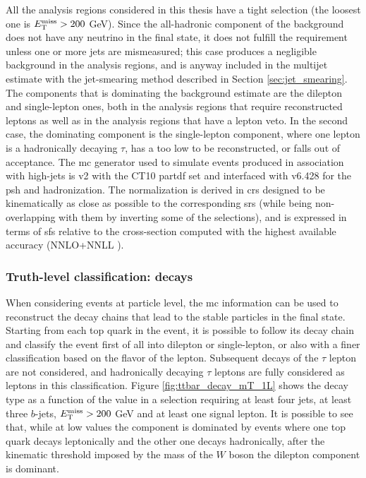 All the analysis regions considered in this thesis have a tight \met selection (the loosest one is $E_{\rm T}^{\mathrm{miss}} > 200$ GeV). Since the all-hadronic component 
of the \ttbar background does not have any neutrino in the final state, it does not fulfill the \met requirement unless one or more jets are mismeasured; 
this case produces a negligible background in the analysis regions, and is anyway included in the multijet estimate with the jet-smearing method described in Section \ref{sec:jet_smearing}.
The \ttbar components that is dominating the background estimate are the dilepton and single-lepton ones, both in the analysis regions that require reconstructed leptons as well as in the analysis regions that have a lepton veto.
In the second case, the dominating component is the single-lepton component, where one lepton is a hadronically decaying $\tau$, has a \pt too low to be reconstructed, or falls out of acceptance. 
The \gls{mc} generator used to simulate \ttbar events produced in association with high-\pt jets is \PowhegBox v2 with the CT10 \gls{partdf} set \cite{Lai:2010vv} and interfaced with \PY v6.428 \cite{Sjostrand:2006za} for the \gls{psh} and hadronization. 
The normalization is derived in \glspl{cr} designed to be kinematically as close as possible to the corresponding \glspl{sr} (while being non-overlapping with them by inverting some of the selections), and is expressed in terms of \glspl{sf} relative to the cross-section computed with the highest
available accuracy (NNLO+NNLL \cite{Czakon:2011xx}).

\subsubsection*{Truth-level classification: \ttbar decays}

When considering events at particle level,
the \gls{mc} information can be used to reconstruct the decay chains that lead to the stable particles in the final state. 
Starting from each top quark in the event, it is possible to follow its decay chain and classify the event first of all into dilepton or single-lepton, or also with a finer classification based on the flavor of the lepton. 
Subsequent decays of the $\tau$ lepton are not considered, and hadronically decaying $\tau$ leptons are fully considered as leptons in this classification. 
Figure \ref{fig:ttbar_decay_mT_1L} shows the \ttbar decay type as a function of the \mt value  in a selection requiring at least four jets, at least three $b$-jets, $E_{\rm T}^{\mathrm{miss}}>200$ GeV and at least one signal lepton. It is possible to see that, while at low \mt values the \ttbar component is dominated by events where one top quark decays leptonically and the other one decays hadronically, after the kinematic threshold imposed by the mass of the $W$ boson the dilepton component is dominant. 

